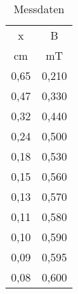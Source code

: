 

\begin{table}
  \centering
  \caption{Messdaten}
  \label{tab:some_data}
  \begin{tabular}{c c }
    \toprule
     x &	 B	   \\
     cm &   mT  \\
    \midrule
  0,65  &   0,210\\
  0,47  &   0,330\\
  0,32  &   0,440\\
  0,24  &   0,500\\
  0,18  &   0,530\\
  0,15  &   0,560\\
  0,13  &   0,570\\
  0,11  &   0,580\\
  0,10  &   0,590\\
  0,09  &   0,595\\
  0,08  &   0,600\\


    \bottomrule
  \end{tabular}
\end{table}
